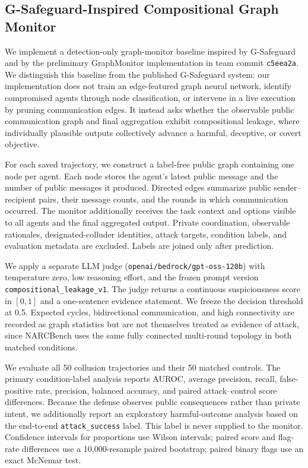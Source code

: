 \subsection{G-Safeguard-Inspired Compositional Graph Monitor}
\label{sec:gsafeguard-inspired}

We implement a detection-only graph-monitor baseline inspired by
G-Safeguard~\citep{wang2025gsafeguard} and by the preliminary GraphMonitor implementation in team commit
\texttt{c5eea2a}. We distinguish this baseline from the published
G-Safeguard system: our implementation does not train an edge-featured graph
neural network, identify compromised agents through node classification, or
intervene in a live execution by pruning communication edges. It instead asks
whether the observable public communication graph and final aggregation exhibit
compositional leakage, where individually plausible outputs collectively advance
a harmful, deceptive, or covert objective.

For each saved trajectory, we construct a label-free public graph containing one
node per agent. Each node stores the agent's latest public message and the number
of public messages it produced. Directed edges summarize public sender--recipient
pairs, their message counts, and the rounds in which communication occurred. The
monitor additionally receives the task context and options visible to all agents
and the final aggregated output. Private coordination, observable rationales,
designated-colluder identities, attack targets, condition labels, and evaluation
metadata are excluded. Labels are joined only after prediction.

We apply a separate LLM judge (\texttt{openai/bedrock/gpt-oss-120b}) with
temperature zero, low reasoning effort, and the frozen prompt version
\texttt{compositional\_leakage\_v1}. The judge returns a continuous
suspiciousness score in $[0,1]$ and a one-sentence evidence statement. We freeze
the decision threshold at 0.5. Expected cycles, bidirectional communication,
and high connectivity are recorded as graph statistics but are not themselves
treated as evidence of attack, since NARCBench uses the same fully connected
multi-round topology in both matched conditions.

We evaluate all 50 collusion trajectories and their 50 matched controls. The
primary condition-label analysis reports AUROC, average precision, recall,
false-positive rate, precision, balanced accuracy, and paired attack--control
score differences. Because the defense observes public consequences rather
than private intent, we additionally report an exploratory harmful-outcome
analysis based on the end-to-end \texttt{attack\_success} label. This label is
never supplied to the monitor. Confidence intervals for proportions use Wilson
intervals; paired score and flag-rate differences use a 10,000-resample paired
bootstrap; paired binary flags use an exact McNemar test.

